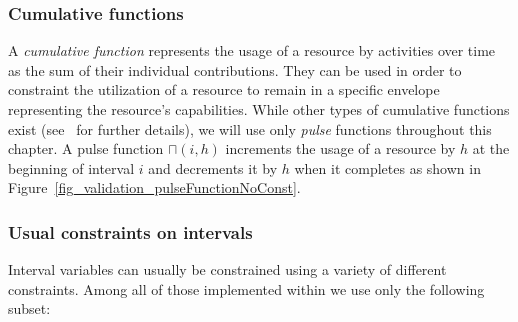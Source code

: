 \documentclass[main.tex]{subfiles}
\begin{document}
\subsubsection{Cumulative functions}
A \emph{cumulative function} represents the usage of a resource by activities
over time as the sum of their individual contributions. They can be used in
order to constraint the utilization of a resource to remain in a specific
envelope representing the resource's capabilities. While other types of
cumulative functions exist (see~\cite{Laborie08, Laborie09} for further
details), we will use only \emph{pulse} functions throughout this chapter. A
pulse function $\sqcap(i, h)$ increments the usage of a resource by $h$ at the
beginning of interval $i$ and decrements it by $h$ when it completes as shown
in Figure~\ref{fig_validation_pulseFunctionNoConst}.

\subsubsection{Usual constraints on intervals}
Interval variables can usually be constrained using a variety of different
constraints. Among all of those implemented within \CPOpti we use only the
following subset:
\end{document}
